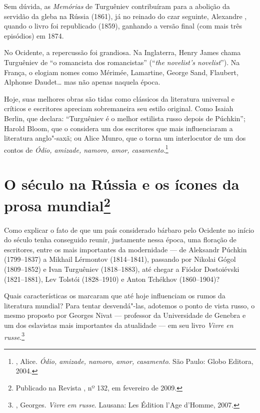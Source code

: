 Sem dúvida, as \emph{Memórias} de Turguêniev contribuíram para a abolição da servidão da gleba na Rússia (1861), já no reinado do czar seguinte, Alexandre , quando o livro foi republicado (1859), ganhando a versão final (com mais três episódios) em 1874.

No Ocidente, a repercussão foi grandiosa. Na Inglaterra, Henry James chama Turguêniev de ``o romancista dos romancistas'' (``\emph{the novelist's novelist}''). Na França, o elogiam nomes como Mérimée, Lamartine, George Sand, Flaubert, Alphonse Daudet\ldots{} mas não apenas naquela época.

Hoje, suas melhores obras são tidas como clássicos da literatura universal e críticos e escritores apreciam sobremaneira seu estilo original. Como Isaiah Berlin, que declara: ``Turguêniev é o melhor estilista russo depois de Púchkin''; Harold Bloom, que o considera um dos escritores que mais influenciaram a literatura anglo"-saxã; ou Alice Munro, que o torna um interlocutor de um dos contos de \emph{Ódio, amizade, namoro, amor, casamento}.\footnote{, Alice. \emph{Ódio, amizade, namoro, amor, casamento}. São Paulo: Globo Editora, 2004.}

\chapter{O século {} na Rússia e os ícones da prosa mundial\footnote{Publicado na Revista {}, nº 132, em fevereiro de 2009.}}

Como explicar o fato de que um país considerado bárbaro pelo Ocidente no
início do século  tenha conseguido reunir, justamente nessa época,
uma floração de escritores, entre os mais importantes da modernidade ---
de Aleksandr Púchkin (1799--1837) a Mikhail Lérmontov (1814--1841),
passando por Nikolai Gógol (1809--1852) e Ivan Turguêniev (1818--1883),
até chegar a Fiódor Dostoiévski (1821--1881), Lev Tolstói (1828--1910) e
Anton Tchékhov (1860--1904)?

Quais características os marcaram que até hoje influenciam os rumos da literatura mundial? Para tentar desvendá"-las, adotemos o ponto de vista russo, o mesmo proposto por Georges Nivat --- professor da Universidade de Genebra e um dos eslavistas mais importantes da atualidade --- em seu livro \emph{Vivre en russe}.\footnote{, Georges. \emph{Vivre em russe}. Lausana: Les Édition l'Age d'Homme, 2007.}

